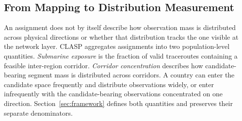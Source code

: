 \subsection{From Mapping to Distribution Measurement}

An assignment does not by itself describe how observation mass is distributed
across physical directions or whether that distribution tracks the one visible
at the network layer. CLASP aggregates assignments into two population-level
quantities. \emph{Submarine exposure} is the fraction of valid traceroutes
containing a feasible inter-region corridor. \emph{Corridor concentration}
describes how candidate-bearing segment mass is distributed across corridors.
A country can enter the candidate space frequently and distribute observations
widely, or enter infrequently with the candidate-bearing observations
concentrated on one direction. Section~\ref{sec:framework} defines both
quantities and preserves their separate denominators.
